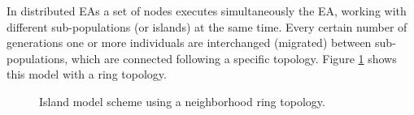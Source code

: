 \documentclass[final,1p,times]{elsarticle}
\begin{document}
In distributed EAs a set of nodes executes simultaneously the EA, working with different sub-populations (or islands) at the same time. Every certain number of generations one or more individuals are interchanged (migrated) between sub-populations, which are connected following a specific topology. Figure \ref{fig:islands} shows this model with a ring topology.  %






\begin{figure}[htb]
\centering
{}
\caption{Island model scheme using a neighborhood ring topology.}
\label{fig:islands}
\end{figure}
\end{document}
